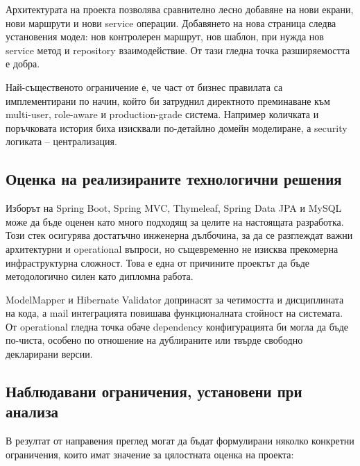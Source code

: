 Архитектурата на проекта позволява сравнително лесно добавяне на нови екрани, нови маршрути и нови service операции. Добавянето на нова страница следва установения модел: нов контролерен маршрут, нов шаблон, при нужда нов service метод и repository взаимодействие. От тази гледна точка разширяемостта е добра.

Най-същественото ограничение е, че част от бизнес правилата са имплементирани по начин, който би затруднил директното преминаване към multi-user, role-aware и production-grade система. Например количката и поръчковата история биха изисквали по-детайлно домейн моделиране, а security логиката -- централизация.

\subsection{Оценка на реализираните технологични решения}

Изборът на Spring Boot, Spring MVC, Thymeleaf, Spring Data JPA и MySQL може да бъде оценен като много подходящ за целите на настоящата разработка. Този стек осигурява достатъчно инженерна дълбочина, за да се разглеждат важни архитектурни и operational въпроси, но същевременно не изисква прекомерна инфраструктурна сложност. Това е една от причините проектът да бъде методологично силен като дипломна работа.

ModelMapper и Hibernate Validator допринасят за четимостта и дисциплината на кода, а mail интеграцията повишава функционалната стойност на системата. От operational гледна точка обаче dependency конфигурацията би могла да бъде по-чиста, особено по отношение на дублираните или твърде свободно декларирани версии.

\subsection{Наблюдавани ограничения, установени при анализа}

В резултат от направения преглед могат да бъдат формулирани няколко конкретни ограничения, които имат значение за цялостната оценка на проекта:

